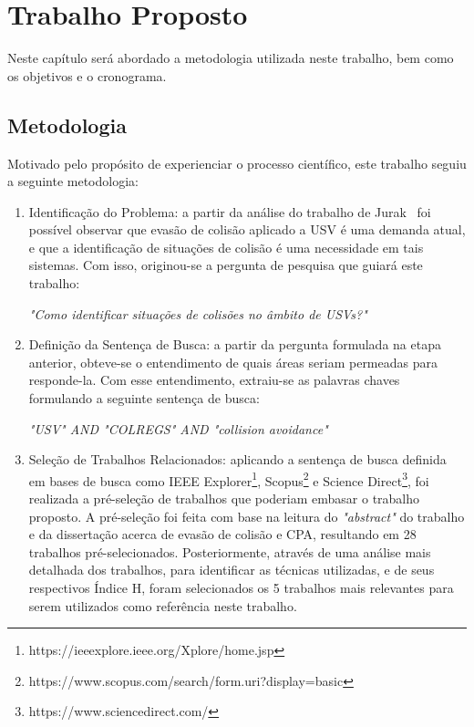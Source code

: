 \chapter{Trabalho Proposto}

    Neste capítulo será abordado a metodologia utilizada neste trabalho, bem como os objetivos e o cronograma.

    \section{Metodologia}
        Motivado pelo propósito de experienciar o processo científico, este trabalho seguiu a seguinte metodologia: 
        
        \begin{enumerate}[label=\alph*)]
            \item Identificação do Problema: a partir da análise do trabalho de Jurak~\cite{JURAK2020} foi possível observar que evasão de colisão aplicado a USV é uma demanda atual, e que a identificação de situações de colisão é uma necessidade em tais sistemas. Com isso, originou-se a pergunta de pesquisa que guiará este trabalho:
            
            \vspace{3mm}
            
            \centerline{\textit{"Como identificar situações de colisões no âmbito de USVs?"}}
            
            \item Definição da Sentença de Busca: a partir da pergunta formulada na etapa anterior, obteve-se o entendimento de quais áreas seriam permeadas para responde-la. Com esse entendimento, extraiu-se as palavras chaves formulando a seguinte sentença de busca:
            
            \vspace{3mm}
            
            \centerline{\textit{"USV" AND "COLREGS" AND "collision avoidance"}}
            
            \item Seleção de Trabalhos Relacionados: aplicando a sentença de busca definida em bases de busca como IEEE Explorer\footnote{https://ieeexplore.ieee.org/Xplore/home.jsp}, Scopus\footnote{https://www.scopus.com/search/form.uri?display=basic} e Science Direct\footnote{https://www.sciencedirect.com/}, foi realizada a pré-seleção de trabalhos que poderiam embasar o trabalho proposto. A pré-seleção foi feita com base na leitura do \textit{"abstract"} do trabalho e da dissertação acerca de evasão de colisão e CPA, resultando em 28 trabalhos pré-selecionados. Posteriormente, através de uma análise mais detalhada dos trabalhos, para identificar as técnicas utilizadas, e de seus respectivos Índice H, foram selecionados os 5 trabalhos mais relevantes para serem utilizados como referência neste trabalho.
            

\end{enumerate}
